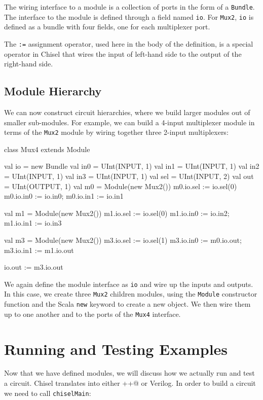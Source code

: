 \documentclass[twocolumn,10pt]{article}
\def\code#1{{\tt #1}}
\begin{document}
\noindent
The wiring interface to a module is a collection of ports in the
form of a \code{Bundle}.  The interface to the module is defined
through a field named \code{io}.  For \code{Mux2}, \code{io} is
defined as a bundle with four fields, one for each multiplexer port.

The \code{:=} assignment operator, used here in the body of the
definition, is a special operator in Chisel that wires the input of
left-hand side to the output of the right-hand side.

\subsection{Module Hierarchy}

We can now construct circuit hierarchies, where we build larger modules out
of smaller sub-modules.  For example, we can build a 4-input
multiplexer module in terms of the \code{Mux2} module by wiring
together three 2-input multiplexers:

\begin{scala}
class Mux4 extends Module {
  val io = new Bundle {
    val in0 = UInt(INPUT, 1)
    val in1 = UInt(INPUT, 1)
    val in2 = UInt(INPUT, 1)
    val in3 = UInt(INPUT, 1)
    val sel = UInt(INPUT, 2)
    val out = UInt(OUTPUT, 1)
  }
  val m0 = Module(new Mux2())
  m0.io.sel := io.sel(0) 
  m0.io.in0 := io.in0; m0.io.in1 := io.in1

  val m1 = Module(new Mux2())
  m1.io.sel := io.sel(0) 
  m1.io.in0 := io.in2; m1.io.in1 := io.in3

  val m3 = Module(new Mux2())
  m3.io.sel := io.sel(1) 
  m3.io.in0 := m0.io.out; m3.io.in1 := m1.io.out

  io.out := m3.io.out
}
\end{scala}

\noindent
We again define the module interface as \code{io} and wire up the
inputs and outputs.  In this case, we create three \code{Mux2}
children modules, using the \code{Module} constructor function and 
the Scala \code{new} keyword to create a
new object.  We then wire them up to one another and to the ports of
the \code{Mux4} interface.

\section{Running and Testing Examples}

Now that we have defined modules, we will discuss how we actually run and test a circuit.  Chisel translates into either \verb@C++@ or Verilog.   In order to build a circuit we need to call \code{chiselMain}:
\end{document}
